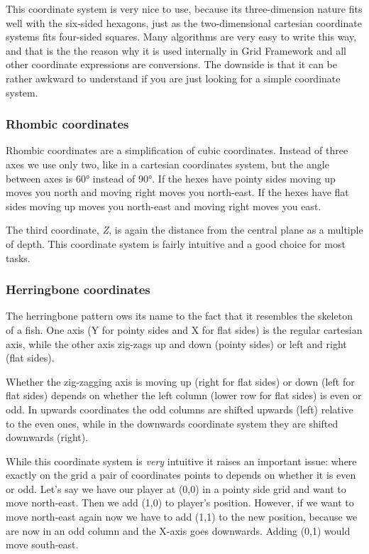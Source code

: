 This coordinate system is very nice to use, because its three-\/dimension nature fits well with the six-\/sided hexagons, just as the two-\/dimensional cartesian coordinate systems fits four-\/sided squares. Many algorithms are very easy to write this way, and that is the the reason why it is used internally in Grid Framework and all other coordinate expressions are conversions. The downside is that it can be rather awkward to understand if you are just looking for a simple coordinate system.

\subsubsection*{Rhombic coordinates}

Rhombic coordinates are a simplification of cubic coordinates. Instead of three axes we use only two, like in a cartesian coordinates system, but the angle between axes is 60° instead of 90°. If the hexes have pointy sides moving up moves you north and moving right moves you north-\/east. If the hexes have flat sides moving up moves you north-\/east and moving right moves you east.



The third coordinate, {\itshape Z}, is again the distance from the central plane as a multiple of {\ttfamily depth}. This coordinate system is fairly intuitive and a good choice for most tasks.

\subsubsection*{Herringbone coordinates}

The herringbone pattern ows its name to the fact that it resembles the skeleton of a fish. One axis (Y for pointy sides and X for flat sides) is the regular cartesian axis, while the other axis zig-\/zags up and down (pointy sides) or left and right (flat sides).



Whether the zig-\/zagging axis is moving up (right for flat sides) or down (left for flat sides) depends on whether the left column (lower row for flat sides) is even or odd. In upwards coordinates the odd columns are shifted upwards (left) relative to the even ones, while in the downwards coordinate system they are shifted downwards (right).

While this coordinate system is {\itshape very} intuitive it raises an important issue\+: where exactly on the grid a pair of coordinates points to depends on whether it is even or odd. Let's say we have our player at (0,0) in a pointy side grid and want to move north-\/east. Then we add (1,0) to player's position. However, if we want to move north-\/east again now we have to add (1,1) to the new position, because we are now in an odd column and the X-\/axis goes downwards. Adding (0,1) would move south-\/east.

